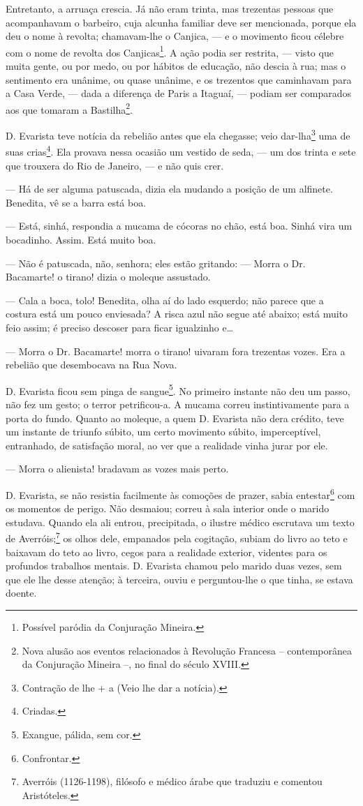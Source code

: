 Entretanto, a arruaça crescia. Já não eram trinta, mas trezentas pessoas
que acompanhavam o barbeiro, cuja alcunha familiar deve ser mencionada,
porque ela deu o nome à revolta; chamavam-lhe o Canjica, --- e o
movimento ficou célebre com o nome de revolta dos Canjicas\footnote{Possível
  paródia da Conjuração Mineira.}. A ação podia ser restrita, --- visto
que muita gente, ou por medo, ou por hábitos de educação, não descia à
rua; mas o sentimento era unânime, ou quase unânime, e os trezentos que
caminhavam para a Casa Verde, --- dada a diferença de Paris a Itaguaí,
--- podiam ser comparados aos que tomaram a Bastilha\footnote{Nova
  alusão aos eventos relacionados à Revolução Francesa -- contemporânea
  da Conjuração Mineira --, no final do século XVIII.}.

D. Evarista teve notícia da rebelião antes que ela chegasse; veio
dar-lha\footnote{Contração de lhe + a (Veio lhe dar a notícia).} uma de
suas crias\footnote{Criadas.}. Ela provava nessa ocasião um vestido de
seda, --- um dos trinta e sete que trouxera do Rio de Janeiro, --- e não
quis crer.

--- Há de ser alguma patuscada, dizia ela mudando a posição de um
alfinete. Benedita, vê se a barra está boa.

--- Está, sinhá, respondia a mucama de cócoras no chão, está boa. Sinhá
vira um bocadinho. Assim. Está muito boa.

--- Não é patuscada, não, senhora; eles estão gritando: --- Morra o Dr.
Bacamarte! o tirano! dizia o moleque assustado.

--- Cala a boca, tolo! Benedita, olha aí do lado esquerdo; não parece
que a costura está um pouco enviesada? A risca azul não segue até
abaixo; está muito feio assim; é preciso descoser para ficar igualzinho
e\ldots{}

--- Morra o Dr. Bacamarte! morra o tirano! uivaram fora trezentas vozes.
Era a rebelião que desembocava na Rua Nova.

D. Evarista ficou sem pinga de sangue\footnote{Exangue, pálida, sem cor.}.
No primeiro instante não deu um passo, não fez um gesto; o terror
petrificou-a. A mucama correu instintivamente para a porta do fundo.
Quanto ao moleque, a quem D. Evarista não dera crédito, teve um instante
de triunfo súbito, um certo movimento súbito, imperceptível, entranhado,
de satisfação moral, ao ver que a realidade vinha jurar por ele.

--- Morra o alienista! bradavam as vozes mais perto.

D. Evarista, se não resistia facilmente às comoções de prazer, sabia
entestar\footnote{Confrontar.} com os momentos de perigo. Não desmaiou;
correu à sala interior onde o marido estudava. Quando ela ali entrou,
precipitada, o ilustre médico escrutava um texto de Averróis;\footnote{Averróis
  (1126-1198), filósofo e médico árabe que traduziu e comentou
  Aristóteles.} os olhos dele, empanados pela cogitação, subiam do livro
ao teto e baixavam do teto ao livro, cegos para a realidade exterior,
videntes para os profundos trabalhos mentais. D. Evarista chamou pelo
marido duas vezes, sem que ele lhe desse atenção; à terceira, ouviu e
perguntou-lhe o que tinha, se estava doente.

